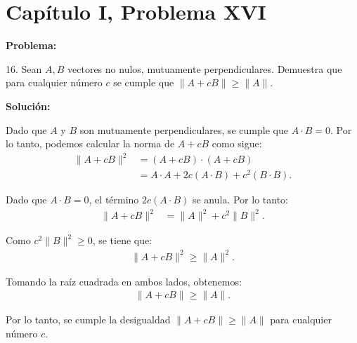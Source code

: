 \section*{Capítulo I, Problema XVI}

\textbf{Problema:}

16. Sean $A, B$ vectores no nulos, mutuamente perpendiculares. Demuestra que para cualquier número $c$ se cumple que $\|A + cB\| \geq \|A\|$.

\textbf{Solución:}

Dado que $A$ y $B$ son mutuamente perpendiculares, se cumple que $A \cdot B = 0$. Por lo tanto, podemos calcular la norma de $A + cB$ como sigue:
\begin{align*}
    \|A + cB\|^2 &= (A + cB) \cdot (A + cB) \\
    &= A \cdot A + 2c(A \cdot B) + c^2(B \cdot B).
\end{align*}

Dado que $A \cdot B = 0$, el término $2c(A \cdot B)$ se anula. Por lo tanto:
\begin{align*}
    \|A + cB\|^2 &= \|A\|^2 + c^2\|B\|^2.
\end{align*}

Como $c^2\|B\|^2 \geq 0$, se tiene que:
\begin{align*}
    \|A + cB\|^2 \geq \|A\|^2.
\end{align*}

Tomando la raíz cuadrada en ambos lados, obtenemos:
\begin{align*}
    \|A + cB\| \geq \|A\|.
\end{align*}

Por lo tanto, se cumple la desigualdad $\|A + cB\| \geq \|A\|$ para cualquier número $c$.